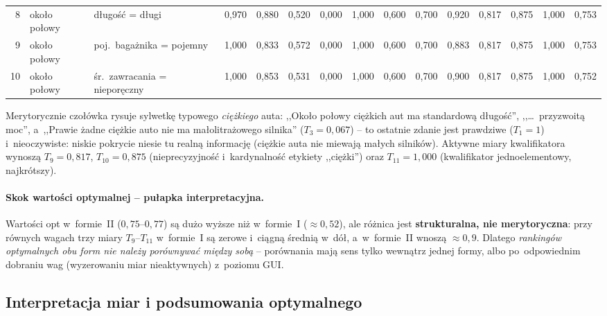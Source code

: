 \documentclass{article}
\begin{document}
\begin{table}[H]
{\begin{tabular}{r l l r r r r r r r r r r r r}
8  & około połowy & długość = długi               & 0,970 & 0,880 & 0,520 & 0,000 & 1,000 & 0,600 & 0,700 & 0,920 & 0,817 & 0,875 & 1,000 & 0,753 \\
9  & około połowy & poj.\ bagażnika = pojemny     & 1,000 & 0,833 & 0,572 & 0,000 & 1,000 & 0,600 & 0,700 & 0,883 & 0,817 & 0,875 & 1,000 & 0,753 \\
10 & około połowy & śr.\ zawracania = nieporęczny & 1,000 & 0,853 & 0,531 & 0,000 & 1,000 & 0,600 & 0,700 & 0,900 & 0,817 & 0,875 & 1,000 & 0,752 \\
\bottomrule
\end{tabular}}
\end{table}

Merytorycznie czołówka rysuje sylwetkę typowego \emph{ciężkiego} auta:
,,Około połowy ciężkich aut ma standardową długość'', ,,\dots\ przyzwoitą
moc'', a~,,Prawie żadne ciężkie auto nie ma małolitrażowego silnika''
($T_3 = 0{,}067$) -- to ostatnie zdanie jest prawdziwe ($T_1 = 1$)
i~nieoczywiste: niskie pokrycie niesie tu realną informację (ciężkie auta
nie miewają małych silników). Aktywne miary kwalifikatora wynoszą
$T_9 = 0{,}817$, $T_{10} = 0{,}875$ (nieprecyzyjność i~kardynalność etykiety
,,ciężki'') oraz $T_{11} = 1{,}000$ (kwalifikator jednoelementowy, najkrótszy).

\paragraph{Skok wartości optymalnej -- pułapka interpretacyjna.}
Wartości opt w~formie~II ($0{,}75$--$0{,}77$) są dużo wyższe niż w~formie~I
($\approx 0{,}52$), ale różnica jest \textbf{strukturalna, nie merytoryczna}:
przy równych wagach trzy miary $T_9$--$T_{11}$ w~formie~I są zerowe i~ciągną
średnią w~dół, a~w~formie~II wnoszą $\approx 0{,}9$. Dlatego \emph{rankingów
optymalnych obu form nie należy porównywać między sobą} -- porównania mają
sens tylko wewnątrz jednej formy, albo po~odpowiednim dobraniu wag (wyzerowaniu
miar nieaktywnych) z~poziomu GUI.

\subsection{Interpretacja miar i podsumowania optymalnego}
\label{sec:single-interpret}
\end{document}
